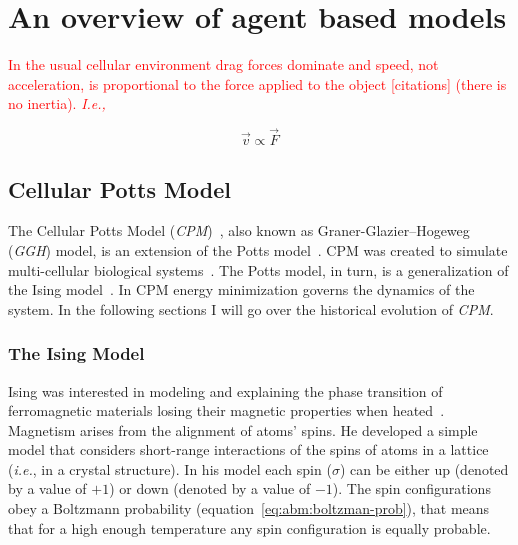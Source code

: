 \chapter{An overview of agent based models}\label{cha:abm}


\textcolor{red}{In the usual cellular environment drag forces dominate and speed, not acceleration, is proportional to the force applied to the object [citations] (there is no inertia). \textit{I.e.,}}


\begin{equation}\label{eq:abm:aristotle-said-nothing-wrong}
    \Vec{v} \propto \Vec{F}
\end{equation}


\section{Cellular Potts Model}\label{sec:abm:cpm-history}

The Cellular Potts Model (\textit{CPM})~\cite{graner1992simulation, savill_modelling_1997}, also known as Graner-Glazier–Hogeweg (\textit{GGH}) model, is an extension of the Potts model~\cite{potts1952some}. CPM was created to simulate multi-cellular biological systems~\cite{graner1992simulation}. The Potts model, in turn, is a generalization of the Ising model~\cite{ising1925beitrag}. In CPM energy minimization governs the dynamics of the system.
In the following sections I will go over the historical evolution of \textit{CPM}.

\subsection{The Ising Model}\label{sec:abm:cpm-history:ising}

Ising was interested in modeling and explaining the phase transition of ferromagnetic materials losing their magnetic properties when heated~\cite{ising1925beitrag}. Magnetism arises from the alignment of atoms' spins. He developed a simple model that considers short-range interactions of the spins of atoms in a lattice (\textit{i.e.}, in a crystal structure). In his model each spin ($\sigma$) can be either up (denoted by a value of $+1$) or down (denoted by a value of $-1$). The spin configurations obey a Boltzmann probability (equation~\ref{eq:abm:boltzman-prob}), that means that for a high enough temperature any spin configuration is equally probable.

